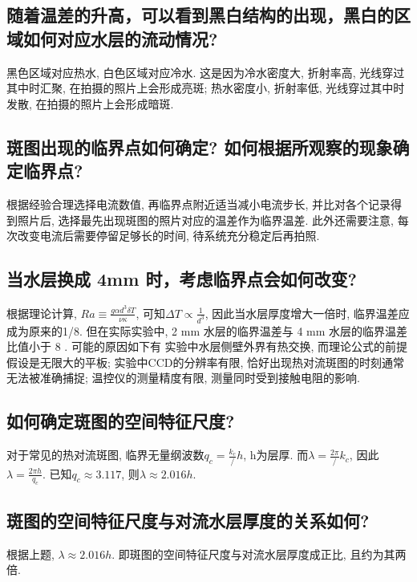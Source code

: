 \documentclass[font=default]{mpltx}
\begin{document}
\subsection{随着温差的升高，可以看到黑白结构的出现，黑白的区域如何对应水层的流动情况?}
黑色区域对应热水, 白色区域对应冷水. 这是因为冷水密度大, 折射率高, 光线穿过其中时汇聚, 在拍摄的照片上会形成亮斑; 热水密度小, 折射率低, 光线穿过其中时发散, 在拍摄的照片上会形成暗斑.
\subsection{斑图出现的临界点如何确定? 如何根据所观察的现象确定临界点?}
根据经验合理选择电流数值, 再临界点附近适当减小电流步长, 并比对各个记录得到照片后, 选择最先出现斑图的照片对应的温差作为临界温差.
此外还需要注意, 每次改变电流后需要停留足够长的时间, 待系统充分稳定后再拍照.
\subsection{当水层换成 4mm 时，考虑临界点会如何改变?}
根据理论计算, $Ra\equiv\frac{g\alpha d^3\delta T}{\nu\kappa}$, 可知$\Delta T \propto \frac{1}{d^3}$, 因此当水层厚度增大一倍时, 临界温差应成为原来的1/8.
但在实际实验中, 2 mm 水层的临界温差与 4 mm 水层的临界温差比值小于 8 . 可能的原因如下有
实验中水层侧壁外界有热交换, 而理论公式的前提假设是无限大的平板; 
实验中CCD的分辨率有限, 恰好出现热对流斑图的时刻通常无法被准确捕捉;
温控仪的测量精度有限, 测量同时受到接触电阻的影响.

\subsection{如何确定斑图的空间特征尺度?}
对于常见的热对流斑图, 临界无量纲波数$q_c = \frac{k_c}/{h}$, h为层厚. 而$\lambda = \frac{2\pi}/{k_c}$, 因此$\lambda = \frac{2\pi h}{q_c}$.
已知$q_c \approx 3.117$, 则$\lambda \approx 2.016 h$.
\subsection{斑图的空间特征尺度与对流水层厚度的关系如何?}
根据上题, $\lambda \approx 2.016 h$. 即斑图的空间特征尺度与对流水层厚度成正比, 且约为其两倍.
\end{document}
